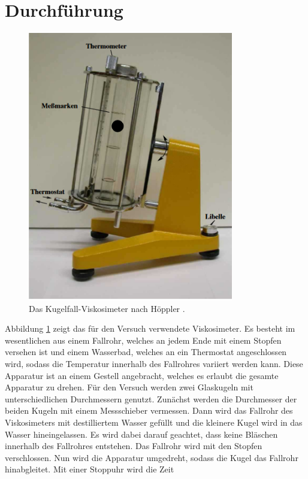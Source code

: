 \section{Durchführung}
\begin{figure}[h]
  \centering
  \includegraphics[width=0.8\textwidth]{assets/viskosimeter.png}
  \caption{Das Kugelfall-Viskosimeter nach Höppler \cite{V207}.}
  \label{fig:viskosimeter}
\end{figure}
\noindent Abbildung \ref{fig:viskosimeter} zeigt das für den Versuch verwendete Viskosimeter. Es besteht im wesentlichen aus einem Fallrohr, welches an jedem Ende mit einem Stopfen 
versehen ist und einem Wasserbad, welches an ein Thermostat angeschlossen wird, sodass die Temperatur innerhalb des Fallrohres variiert werden kann. Diese Apparatur ist an einem 
Gestell angebracht, welches es erlaubt die gesamte Apparatur zu drehen.
Für den Versuch werden zwei Glaskugeln mit unterschiedlichen Durchmessern genutzt. Zunächst werden die Durchmesser der beiden Kugeln mit einem Messschieber vermessen. Dann wird das 
Fallrohr des Viskosimeters mit destilliertem Wasser gefüllt und die kleinere Kugel wird in das Wasser hineingelassen. Es wird dabei darauf geachtet, dass keine Bläschen innerhalb des 
Fallrohres entstehen. Das Fallrohr wird mit den Stopfen verschlossen. Nun wird die Apparatur umgedreht, sodass die Kugel das Fallrohr hinabgleitet. Mit einer Stoppuhr wird die Zeit 

